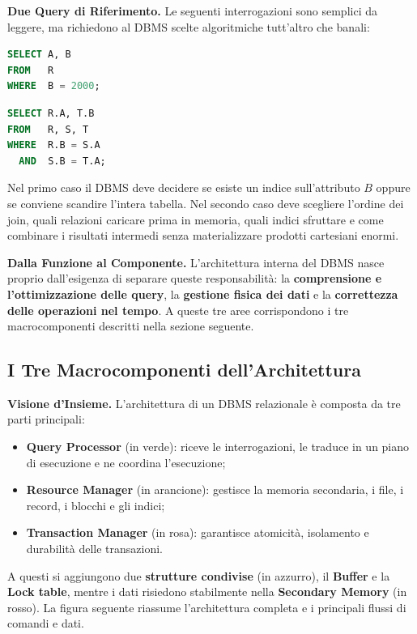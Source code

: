 \documentclass[12pt]{extarticle}
\begin{document}
\medskip
\noindent \textbf{Due Query di Riferimento.} Le seguenti interrogazioni sono semplici da leggere, ma richiedono al DBMS scelte algoritmiche tutt'altro che banali:

\begin{lstlisting}[language=SQL, caption={Selezione su una sola relazione}]
SELECT A, B
FROM   R
WHERE  B = 2000;
\end{lstlisting}

\begin{lstlisting}[language=SQL, caption={Join su tre relazioni}]
SELECT R.A, T.B
FROM   R, S, T
WHERE  R.B = S.A
  AND  S.B = T.A;
\end{lstlisting}

\noindent Nel primo caso il DBMS deve decidere se esiste un indice sull'attributo $B$ oppure se conviene scandire l'intera tabella. Nel secondo caso deve scegliere l'ordine dei join, quali relazioni caricare prima in memoria, quali indici sfruttare e come combinare i risultati intermedi senza materializzare prodotti cartesiani enormi.

\medskip
\noindent \textbf{Dalla Funzione al Componente.} L'architettura interna del DBMS nasce proprio dall'esigenza di separare queste responsabilità: la \textbf{comprensione e l'ottimizzazione delle query}, la \textbf{gestione fisica dei dati} e la \textbf{correttezza delle operazioni nel tempo}. A queste tre aree corrispondono i tre macrocomponenti descritti nella sezione seguente.

\subsection{I Tre Macrocomponenti dell'Architettura}

\noindent \textbf{Visione d'Insieme.} L'architettura di un DBMS relazionale è composta da tre parti principali:
\begin{itemize}
    \item \textbf{Query Processor} (in verde): riceve le interrogazioni, le traduce in un piano di esecuzione e ne coordina l'esecuzione;
    \item \textbf{Resource Manager} (in arancione): gestisce la memoria secondaria, i file, i record, i blocchi e gli indici;
    \item \textbf{Transaction Manager} (in rosa): garantisce atomicità, isolamento e durabilità delle transazioni.
\end{itemize}

\noindent A questi si aggiungono due \textbf{strutture condivise} (in azzurro), il \textbf{Buffer} e la \textbf{Lock table}, mentre i dati risiedono stabilmente nella \textbf{Secondary Memory} (in rosso). La figura seguente riassume l'architettura completa e i principali flussi di comandi e dati.
\end{document}
